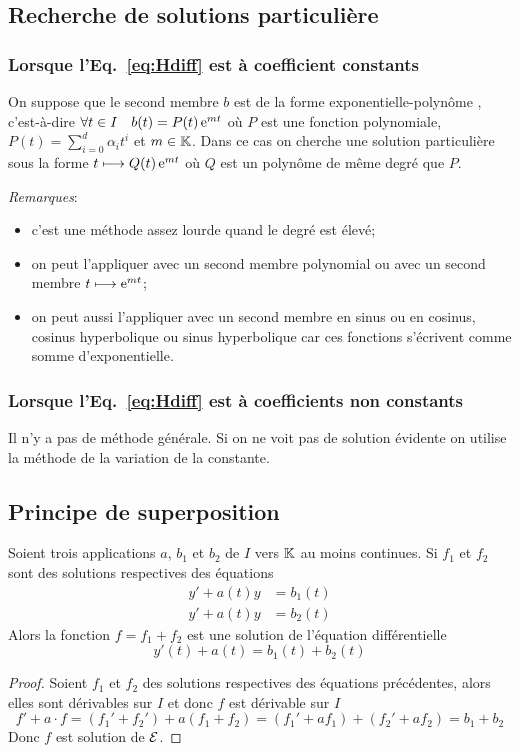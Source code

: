 \subsection{Recherche de solutions particulière}
\label{subsec:recherchesolutionpart}
\subsubsection{Lorsque l'Eq.~\eqref{eq:Hdiff} est à coefficient constants}
\label{subsubsec:recherchesolutionpart-coefconstants}
On suppose que le second membre $b$ est de la forme \og exponentielle-polynôme \fg{}, c'est-à-dire $\forall t \in I \quad b(t)=P(t) \operatorname{e}^{mt}$ où $P$ est une fonction polynomiale, $P(t)=\sum_{i=0}^d \alpha_i t^i$ et $m \in \mathbb{K}$. Dans ce cas on cherche une solution particulière sous la forme $t \longmapsto Q(t)\operatorname{e}^{mt}$ où $Q$ est un polynôme de même degré que $P$.

\emph{Remarques}:
\begin{itemize}
\item c'est une méthode assez lourde quand le degré est élevé;
\item on peut l'appliquer avec un second membre polynomial ou avec un second membre $t \longmapsto \operatorname{e}^{mt}$;
\item on peut aussi l'appliquer avec un second membre en sinus ou en cosinus, cosinus hyperbolique ou sinus hyperbolique car ces fonctions s'écrivent comme somme d'exponentielle.
\end{itemize}
\subsubsection{Lorsque l'Eq.~\eqref{eq:Hdiff} est à coefficients non constants}
\label{subsubsec:recherchesolutionpart-coefnnconstants}
Il n'y a pas de méthode générale. Si on ne voit pas de solution \og évidente \fg{} on utilise la méthode de la variation de la constante.
%
\subsection{Principe de superposition}
\label{subsec:principesuperposition}
\begin{prop}
  Soient trois applications $a$, $b_1$ et $b_2$ de $I$ vers $\mathbb{K}$ au moins continues. Si $f_1$ et $f_2$ sont des solutions respectives des équations
  \begin{align}
    y'+a(t)y&=b_1(t)\\ y'+a(t)y&=b_2(t)
  \end{align}
Alors la fonction $f=f_1+f_2$ est une solution de l'équation différentielle 
\begin{equation}
  y'(t)+a(t)=b_1(t)+b_2(t)
\end{equation}
\end{prop}
\begin{proof}
  Soient $f_1$ et $f_2$ des solutions respectives des équations précédentes, alors elles sont dérivables sur $I$ et donc $f$ est dérivable sur $I$
  \begin{equation}
    f'+a \cdot f=(f_1' + f_2')+a(f_1+f_2)=(f_1'+af_1)+(f_2'+af_2)=b_1+b_2
  \end{equation}
Donc $f$ est solution de $\mathcal{E}$.
\end{proof}
%
